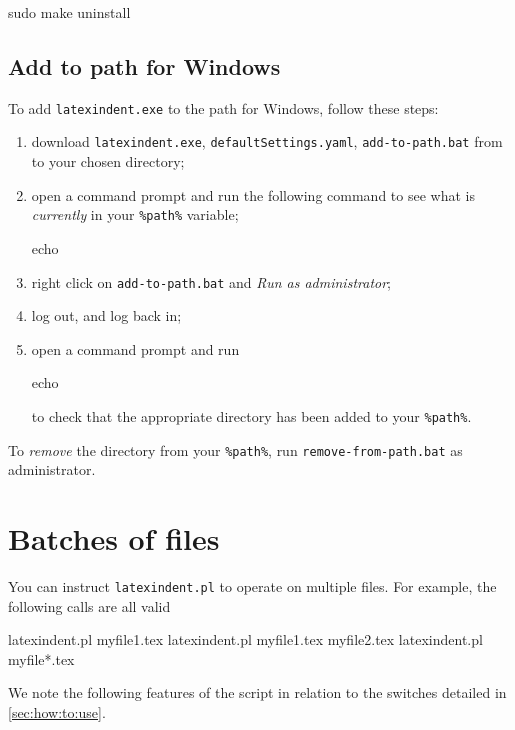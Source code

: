 \documentclass[10pt]{article}
\begin{document}
  \begin{commandshell}
sudo make uninstall
\end{commandshell}

 \subsection{Add to path for Windows}
  To add \texttt{latexindent.exe} to the path for Windows, follow these steps:
  \begin{enumerate}
   \item download \texttt{latexindent.exe}, \texttt{defaultSettings.yaml},
         \texttt{add-to-path.bat} from \cite{latexindent-home} to your chosen directory;
   \item open a command prompt and run the following command to see what is
         \emph{currently} in your \lstinline!%path%! variable;
         \begin{dosprompt}
echo %
          \end{dosprompt}
   \item right click on \texttt{add-to-path.bat} and \emph{Run as administrator};
   \item log out, and log back in;
   \item open a command prompt and run
         \begin{dosprompt}
echo %
          \end{dosprompt}
         to check that the appropriate directory has been added to your
         \lstinline!%path%!.
  \end{enumerate}
  To \emph{remove} the directory from your \lstinline!%path%!, run
  \texttt{remove-from-path.bat} as administrator.

 \section{Batches of files}\label{sec:batches}

  You can  instruct
  \texttt{latexindent.pl} to operate on multiple files. For example, the following calls
  are all valid

  \begin{commandshell}
latexindent.pl myfile1.tex
latexindent.pl myfile1.tex myfile2.tex
latexindent.pl myfile*.tex
        \end{commandshell}

  We note the following features of the script in relation to the switches detailed in
  \cref{sec:how:to:use}.
\end{document}
